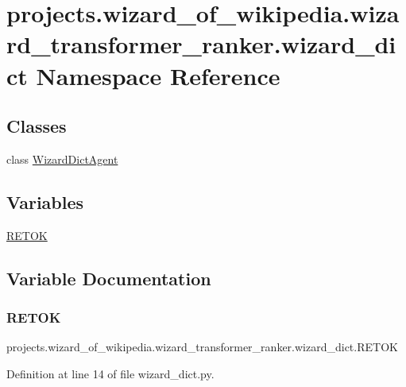 \hypertarget{namespaceprojects_1_1wizard__of__wikipedia_1_1wizard__transformer__ranker_1_1wizard__dict}{}\section{projects.\+wizard\+\_\+of\+\_\+wikipedia.\+wizard\+\_\+transformer\+\_\+ranker.\+wizard\+\_\+dict Namespace Reference}
\label{namespaceprojects_1_1wizard__of__wikipedia_1_1wizard__transformer__ranker_1_1wizard__dict}
\subsection*{Classes}
\begin{DoxyCompactItemize}
\item 
class \hyperlink{classprojects_1_1wizard__of__wikipedia_1_1wizard__transformer__ranker_1_1wizard__dict_1_1WizardDictAgent}{Wizard\+Dict\+Agent}
\end{DoxyCompactItemize}
\subsection*{Variables}
\begin{DoxyCompactItemize}
\item 
\hyperlink{namespaceprojects_1_1wizard__of__wikipedia_1_1wizard__transformer__ranker_1_1wizard__dict_a7d0602ca809535e0fb49318ed85a0dec}{R\+E\+T\+OK}
\end{DoxyCompactItemize}


\subsection{Variable Documentation}
\mbox{\label{namespaceprojects_1_1wizard__of__wikipedia_1_1wizard__transformer__ranker_1_1wizard__dict_a7d0602ca809535e0fb49318ed85a0dec}} 
\subsubsection{\texorpdfstring{R\+E\+T\+OK}{RETOK}}
{\footnotesize\ttfamily projects.\+wizard\+\_\+of\+\_\+wikipedia.\+wizard\+\_\+transformer\+\_\+ranker.\+wizard\+\_\+dict.\+R\+E\+T\+OK}



Definition at line 14 of file wizard\+\_\+dict.\+py.

